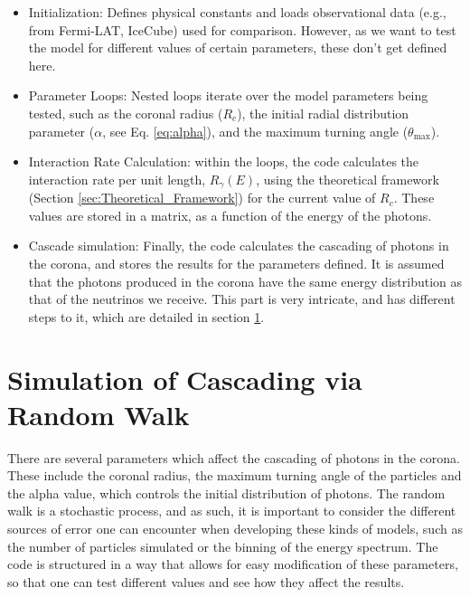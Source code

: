 \begin{itemize}
    \item Initialization: Defines physical constants and loads observational data (e.g., from Fermi-LAT, IceCube) used for comparison. However, as we want to test the model for different values of certain parameters, these don't get defined here.
    \item Parameter Loops: Nested loops iterate over the model parameters being tested, such as the coronal radius ($R_c$), the initial radial distribution parameter ($\alpha$, see Eq. \ref{eq:alpha}), and the maximum turning angle ($\theta_{\max}$).
    \item Interaction Rate Calculation: within the loops, the code calculates the interaction rate per unit length, $R_{\gamma}(E)$, using the theoretical framework (Section \ref{sec:Theoretical_Framework}) for the current value of $R_c$. These values are stored in a matrix, as a function of the energy of the photons.
    \item Cascade simulation: Finally, the code calculates the cascading of photons in the corona, and stores the results for the parameters defined. It is assumed that the photons produced in the corona have the same energy distribution as that of the neutrinos we receive. 
    This part is very intricate, and has different steps to it, which are detailed in section \ref{sec:RandomWalk}.
\end{itemize}

\section{Simulation of Cascading via Random Walk}
\label{sec:RandomWalk}

There are several parameters which affect the cascading of photons in the corona. These include the coronal radius, the maximum turning angle of the particles and the alpha value, which controls the initial distribution of photons. The random walk is a stochastic process, and as such, it is important to consider the different sources of error one can encounter when developing these kinds of models, such as the number of particles simulated or the binning of the energy spectrum. The code is structured in a way that allows for easy modification of these parameters, so that one can test different values and see how they affect the results.

